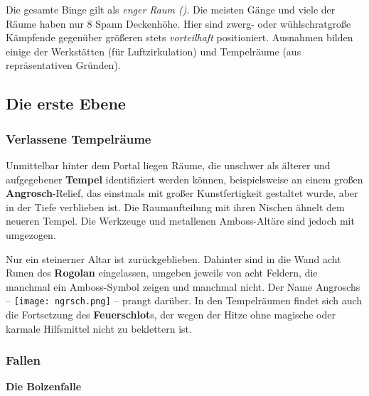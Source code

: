 Die gesamte Binge gilt als \emph{enger Raum ()}.
Die meisten Gänge und viele der Räume haben nur 8 Spann Deckenhöhe.
Hier sind zwerg- oder wühlschratgroße Kämpfende gegenüber größeren stets \emph{vorteilhaft} positioniert.
Ausnahmen bilden einige der Werkstätten (für Luftzirkulation) und  Tempelräume (aus repräsentativen Gründen).

\subsection{Die erste Ebene}

\subsubsection{Verlassene Tempelräume}
Unmittelbar hinter dem Portal liegen Räume, die unschwer als älterer und aufgegebener \textbf{Tempel} identifiziert werden können,
beispielsweise an einem großen \textbf{Angrosch}-Relief, das einstmals mit großer Kunstfertigkeit gestaltet wurde, aber in der Tiefe verblieben ist.
Die Raumaufteilung mit ihren Nischen ähnelt dem neueren Tempel.
Die Werkzeuge und metallenen Amboss-Altäre sind jedoch mit umgezogen.

Nur ein steinerner Altar ist zurückgeblieben. Dahinter sind in die Wand acht Runen des \textbf{Rogolan} eingelassen, umgeben jeweils von acht Feldern, die manchmal ein Amboss-Symbol zeigen und manchmal nicht.
Der Name Angroschs -- \texttt{[image: ngrsch.png]} --
prangt darüber.
In den Tempelräumen findet sich auch die Fortsetzung des \textbf{Feuerschlot}s, der wegen der Hitze ohne magische oder karmale Hilfsmittel nicht zu beklettern ist.

\subsubsection{Fallen}

\textbf{Die Bolzenfalle}

